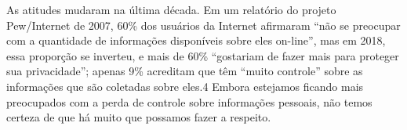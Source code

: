 As atitudes mudaram na última década. Em um relatório do projeto Pew/Internet de
2007, 60\% dos usuários da Internet afirmaram ``não se preocupar com a quantidade
de informações disponíveis sobre eles on-line'', mas em 2018, essa proporção se
inverteu, e mais de 60\% ``gostariam de fazer mais para proteger sua
privacidade''; apenas 9\% acreditam que têm ``muito controle'' sobre as informações
que são coletadas sobre eles.4 Embora estejamos ficando mais preocupados com a
perda de controle sobre informações pessoais, não temos certeza de que há muito
que possamos fazer a respeito.

